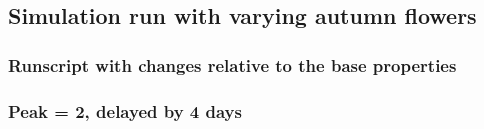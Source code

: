 \subsection{Simulation run with varying autumn flowers}
	\subsubsection{Runscript with changes relative to the base properties}
		
	\subsubsection{Peak = 2, delayed by 4 days}
		\label{chap:sim_R2_1_1}
